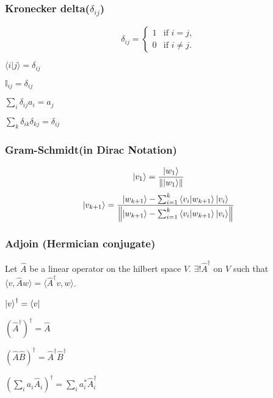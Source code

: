\documentclass[5pt]{article}
\begin{document}
\begin{multicols}{3}
\subsubsection{Kronecker delta($\delta_{ij}$)}
\begin{equation*}
    \delta_{ij} =
    \begin{cases}
        1 & \text{if } i = j, \\
        0 & \text{if } i \neq j.
    \end{cases}
\end{equation*}
\begin{properties}
     \begin{itemize*}
          \item $\langle i|j\rangle=\delta_{ij}$
          \item $\mathbb{I}_{ij}=\delta_{ij}$
          \item $\sum_i\delta_{ij}a_i=a_j$ 
          \item $\sum_k\delta_{ik}\delta_{kj}=\delta_{ij}$ 
     \end{itemize*}
\end{properties}

\subsubsection{Gram-Schmidt\footnotesize{(in Dirac Notation)}}
\begin{equation*}
     \ket{v_1}=\frac{\ket{w_1}}{\norm{\ket{w_1}}}\\
\end{equation*}
\begin{equation*}
     \ket{v_{k+1}}=\frac{\ket{w_{k+1}}-\sum_{i=1}^k\braket{v_i}{w_{k+1}}\ket{v_i}}{\norm{\ket{w_{k+1}}-\sum_{i=1}^k\braket{v_i}{w_{k+1}}\ket{v_i}}}
\end{equation*}

\subsubsection{Adjoin \small{(Hermician conjugate)}}
Let $\hat{A}$ be a linear operator on the hilbert space $V$. 
$\exists! \hat{A}^\dagger$ on $V$ such that $\langle v, \hat{A}w\rangle=\langle\hat{A}^\dagger v, w\rangle$.

\begin{properties}
     \begin{itemize*}
          \item $\ket{v}^\dag=\bra{v}\;$
          \item $(\hat{A}^\dag)^\dag=\hat{A}$
          \item $(\hat{A}\hat{B})^\dagger=\hat{A}^\dagger\hat{B}^\dagger\;\:$     
          \item $(\sum_ia_i\hat{A}_i)^\dag=\sum_i a_i^*\hat{A}_i^\dag$
     \end{itemize*}
\end{properties}



\end{multicols}
\end{document}
